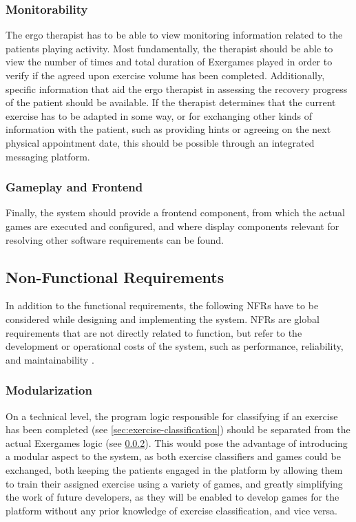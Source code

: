 \subsubsection{Monitorability}
The ergo therapist has to be able to view monitoring information related to the patients playing activity. Most fundamentally, the therapist should be able to view the number of times and total duration of Exergames played in order to verify if the agreed upon exercise volume has been completed. Additionally, specific information that aid the ergo therapist in assessing the recovery progress of the patient should be available. If the therapist determines that the current exercise has to be adapted in some way, or for exchanging other kinds of information with the patient, such as providing hints or agreeing on the next physical appointment date, this should be possible through an integrated messaging platform.

\subsubsection{Gameplay and Frontend}
\label{sec:gameplay}
Finally, the system should provide a frontend component, from which the actual games are executed and configured, and where display components relevant for resolving other software requirements can be found.

\subsection{Non-Functional Requirements}
In addition to the functional requirements, the following \glspl{NFR} have to be considered while designing and implementing the system. \glspl{NFR} are global requirements that are not directly related to function, but refer to the development or operational costs of the system, such as performance, reliability, and maintainability \cite{chung2012non}.

\subsubsection{Modularization}
On a technical level, the program logic responsible for classifying if an exercise has been completed (see \ref{sec:exercise-classification}) should be separated from the actual Exergames logic (see \ref{sec:gameplay}). This would pose the advantage of introducing a modular aspect to the system, as both exercise classifiers and games could be exchanged, both keeping the patients engaged in the platform by allowing them to train their assigned exercise using a variety of games, and greatly simplifying the work of future developers, as they will be enabled to develop games for the platform without any prior knowledge of exercise classification, and vice versa.

